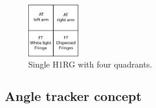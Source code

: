 



\begin{figure}[ht!]
\begin{center}

\includegraphics[width=0.2\textwidth]{Figures/Quad.png}
\caption{Single H1RG with four quadrants.}
\label{fig:quad}
\end{center}
\end{figure}


\subsection{Angle tracker concept}\label{subsec:ANGLE}


